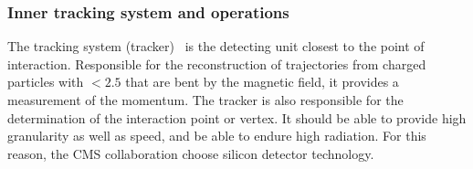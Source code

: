 \subsubsection{Inner tracking system and operations}
\label{sec:TRK}
The tracking system (tracker)~\cite{Chatrchyan:1704291} is the detecting unit closest to the point of interaction. Responsible for the reconstruction of  trajectories from charged particles with \abspsrap $<2.5$ that are bent by the magnetic field, it provides a measurement of the momentum. The tracker is also responsible for the determination of the interaction point or vertex. It should be able to provide high granularity as well as speed, and be able to endure high radiation. For this reason, the CMS collaboration choose silicon detector technology.

